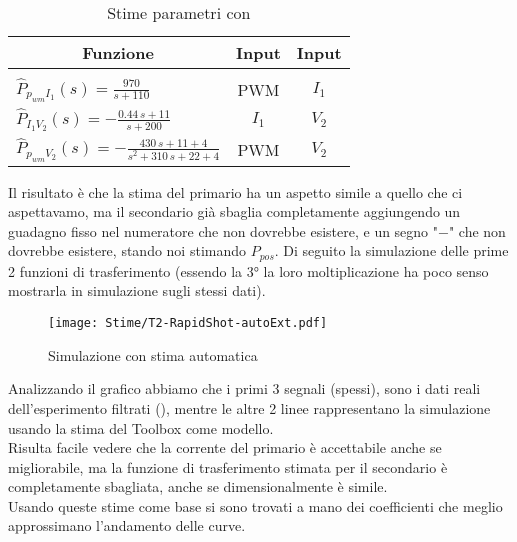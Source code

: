 \begin{table}[H]
	\centering
	\caption[Stime parametri con \cite*{IdentificationToolbox}]{Stime parametri con \cite*{IdentificationToolbox}}		\label{tab:stimaAutomaticaParametri}
	\vspace{1mm}
	\begin{tabular}[t]{||l|c|c||}
		\hline
		\multicolumn{1}{||c}{\textbf{Funzione}}            & \multicolumn{1}{|c}{\textbf{Input}} & \multicolumn{1}{|c||}{\textbf{Input}} \\
		\hline\hline
		                                                   &                                     &                                       \\[-3mm]
		$\hat{P}_{p_{wm} I_1}(s) = \frac{970}{s+110}$      & PWM                                 & $I_1$                                 \\[3mm]

		$\hat{P}_{I_1 V_2}(s) = -\frac{0.44\,s+11}{s+200}$ & $I_1$                               & $V_2$                                 \\[3mm]

		$\hat{P}_{p_{wm} V_2}(s) = -\frac{430\,s+11+4}{s^2+310\,s+22+4}$
		                                                   & PWM                                 & $ V_2 $                               \\
		\hline
	\end{tabular}
\end{table}



Il risultato è che la stima del primario ha un aspetto simile a quello che ci aspettavamo, ma il secondario già sbaglia completamente aggiungendo un guadagno fisso nel numeratore che non dovrebbe esistere, e un segno "$ - $" che non dovrebbe esistere, stando noi stimando $ P_{pos} $.
Di seguito la simulazione delle prime 2 funzioni di trasferimento (essendo la 3° la loro moltiplicazione ha poco senso mostrarla in simulazione sugli stessi dati).

\begin{figure}[H]
	\centering
	\caption[Simulazione con stima automatica]{Simulazione con stima automatica}
	\texttt{[image: Stime/T2-RapidShot-autoExt.pdf]}
\end{figure}

\noindent
Analizzando il grafico abbiamo che i primi 3 segnali (spessi), sono i dati reali dell'esperimento filtrati (), mentre le altre 2 linee rappresentano la simulazione usando la stima del Toolbox come modello.\\
Risulta facile vedere che la corrente del primario è accettabile anche se migliorabile, ma la funzione di trasferimento stimata per il secondario è completamente sbagliata, anche se dimensionalmente è simile.\\
Usando queste stime come base si sono trovati a mano dei coefficienti che meglio approssimano l'andamento delle curve.


